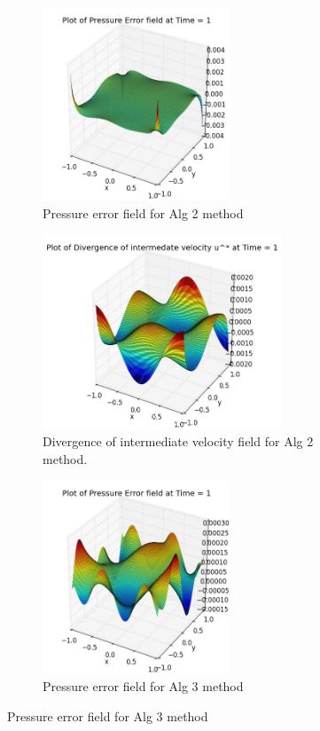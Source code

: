 \begin{figure}[H]
	\centering
	\begin{subfigure}[t]{2.2in}
		\centering
		\includegraphics[width=2.2in]{figures/Pm1b_pf2_np_P_error_t_1_grid_120.jpg}
		\caption{Pressure error field for Alg 2 method}\label{fig:6.6a}		
	\end{subfigure}
	\quad
	\begin{subfigure}[t]{2.8in}
		\centering
		\includegraphics[width=2.8in]{figures/Pm1b_pf2_np_div_uvstar_t_1_grid_120.jpg}
		\caption{Divergence of intermediate velocity field for Alg 2 method. }\label{fig:6.6b}
	\end{subfigure}
	\quad
	\centering
	\begin{subfigure}[t]{2.2in}
		\centering
		\includegraphics[width=2.2in]{figures/Pm2_pf2_cN_np_P_error_t_1_grid_120.jpg}
		\caption{Pressure error field for Alg 3 method}\label{fig:6.6c}		

\end{subfigure}
\end{figure}
